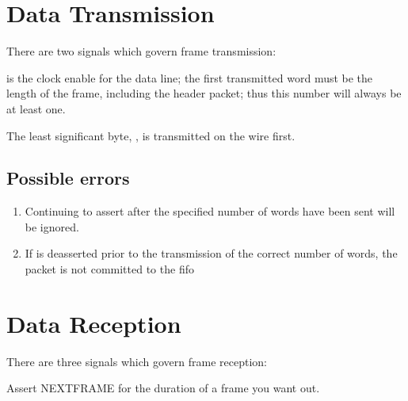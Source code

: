 

\section{Data Transmission}

There are two signals which govern frame transmission: 



 is the clock enable for the data line; the first transmitted
word must be the length of the frame, including the header packet;
thus this number will always be at least one.

The least significant byte, , is transmitted on the
wire first.

\subsection{Possible errors}
\begin{enumerate}
\item Continuing to assert  after the specified
  number of words have been sent will be ignored.
\item If  is deasserted prior to the transmission of the correct number of words, the packet is not committed to the fifo
\end{enumerate}


\section{Data Reception}

There are three signals which govern frame reception: 


Assert NEXTFRAME for the duration of a frame you want out. 

